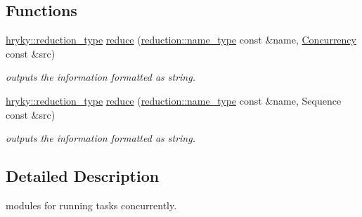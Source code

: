 \subsection*{Functions}
\begin{DoxyCompactItemize}
\item 
\hypertarget{namespacehryky_1_1task_a3cd1766998ce63e0a3886c8a3abd02ca}{\hyperlink{namespacehryky_a343a9a4c36a586be5c2693156200eadc}{hryky\-::reduction\-\_\-type} \hyperlink{namespacehryky_1_1task_a3cd1766998ce63e0a3886c8a3abd02ca}{reduce} (\hyperlink{namespacehryky_1_1reduction_ac686c30a4c8d196bbd0f05629a6b921f}{reduction\-::name\-\_\-type} const \&name, \hyperlink{classhryky_1_1task_1_1_concurrency}{Concurrency} const \&src)}\label{namespacehryky_1_1task_a3cd1766998ce63e0a3886c8a3abd02ca}

\begin{DoxyCompactList}\small\item\em outputs the information formatted as string. \end{DoxyCompactList}\item 
\hypertarget{namespacehryky_1_1task_a5109130622284fda1983e0f44acc5f90}{\hyperlink{namespacehryky_a343a9a4c36a586be5c2693156200eadc}{hryky\-::reduction\-\_\-type} \hyperlink{namespacehryky_1_1task_a5109130622284fda1983e0f44acc5f90}{reduce} (\hyperlink{namespacehryky_1_1reduction_ac686c30a4c8d196bbd0f05629a6b921f}{reduction\-::name\-\_\-type} const \&name, Sequence const \&src)}\label{namespacehryky_1_1task_a5109130622284fda1983e0f44acc5f90}

\begin{DoxyCompactList}\small\item\em outputs the information formatted as string. \end{DoxyCompactList}\end{DoxyCompactItemize}


\subsection{Detailed Description}
modules for running tasks concurrently. 